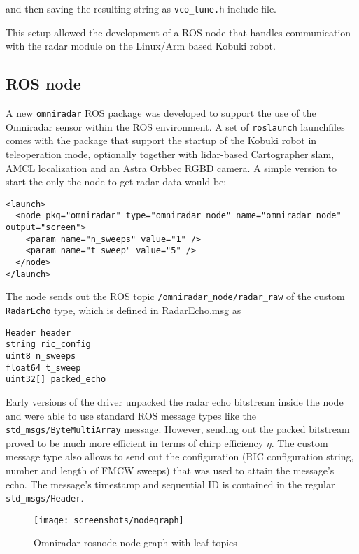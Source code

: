 and then saving the resulting string as \texttt{vco\_tune.h} include
file.

This setup allowed the development of a ROS node that handles
communication with the radar module on the Linux/Arm based Kobuki robot.

\subsection{ROS node}\label{ros-node}

A new \texttt{omniradar} ROS package was developed to support the use of
the Omniradar sensor within the ROS environment. A set of
\texttt{roslaunch} launchfiles comes with the package that support the
startup of the Kobuki robot in teleoperation mode, optionally together
with lidar-based Cartographer slam, AMCL localization and an Astra
Orbbec RGBD camera. A simple version to start the only the node to get
radar data would be:

\begin{verbatim}
<launch>
  <node pkg="omniradar" type="omniradar_node" name="omniradar_node" output="screen">
    <param name="n_sweeps" value="1" />
    <param name="t_sweep" value="5" />
  </node>
</launch>
\end{verbatim}

The node sends out the ROS topic \texttt{/omniradar\_node/radar\_raw} of
the custom \texttt{RadarEcho} type, which is defined in RadarEcho.msg as

\begin{verbatim}
Header header
string ric_config
uint8 n_sweeps
float64 t_sweep
uint32[] packed_echo
\end{verbatim}

Early versions of the driver unpacked the radar echo bitstream inside
the node and were able to use standard ROS message types like the
\texttt{std\_msgs/ByteMultiArray} message. However, sending out the
packed bitstream proved to be much more efficient in terms of chirp
efficiency \(\eta\). The custom message type also allows to send out the
configuration (RIC configuration string, number and length of FMCW
sweeps) that was used to attain the message's echo. The message's
timestamp and sequential ID is contained in the regular
\texttt{std\_msgs/Header}.

\begin{figure}[htp]
    \centering
    \label{fig:nodegraph}
    \texttt{[image: screenshots/nodegraph]}
    \caption{Omniradar rosnode node graph with leaf topics}
\end{figure}

